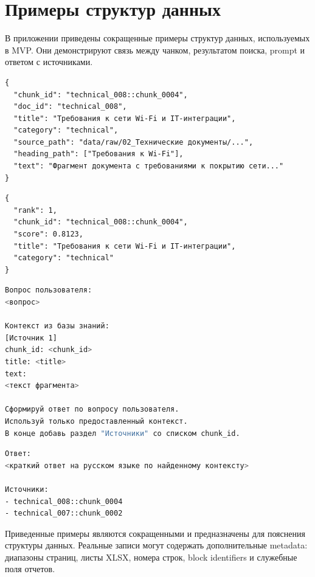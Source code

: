\chapter{Примеры структур данных}
\label{appendix:examples}

В приложении приведены сокращенные примеры структур данных, используемых в MVP. Они демонстрируют связь между чанком, результатом поиска, prompt и ответом с источниками.

\begin{lstlisting}[caption={Пример JSONL-записи чанка}]
{
  "chunk_id": "technical_008::chunk_0004",
  "doc_id": "technical_008",
  "title": "Требования к сети Wi-Fi и IT-интеграции",
  "category": "technical",
  "source_path": "data/raw/02_Технические документы/...",
  "heading_path": ["Требования к Wi-Fi"],
  "text": "Фрагмент документа с требованиями к покрытию сети..."
}
\end{lstlisting}

\begin{lstlisting}[caption={Пример результата dense retrieval}]
{
  "rank": 1,
  "chunk_id": "technical_008::chunk_0004",
  "score": 0.8123,
  "title": "Требования к сети Wi-Fi и IT-интеграции",
  "category": "technical"
}
\end{lstlisting}

\begin{lstlisting}[language=bash,caption={Схема prompt для генерации ответа}]
Вопрос пользователя:
<вопрос>

Контекст из базы знаний:
[Источник 1]
chunk_id: <chunk_id>
title: <title>
text:
<текст фрагмента>

Сформируй ответ по вопросу пользователя.
Используй только предоставленный контекст.
В конце добавь раздел "Источники" со списком chunk_id.
\end{lstlisting}

\begin{lstlisting}[language=bash,caption={Схема ответа с источниками}]
Ответ:
<краткий ответ на русском языке по найденному контексту>

Источники:
- technical_008::chunk_0004
- technical_007::chunk_0002
\end{lstlisting}

Приведенные примеры являются сокращенными и предназначены для пояснения структуры данных. Реальные записи могут содержать дополнительные metadata: диапазоны страниц, листы XLSX, номера строк, block identifiers и служебные поля отчетов.

